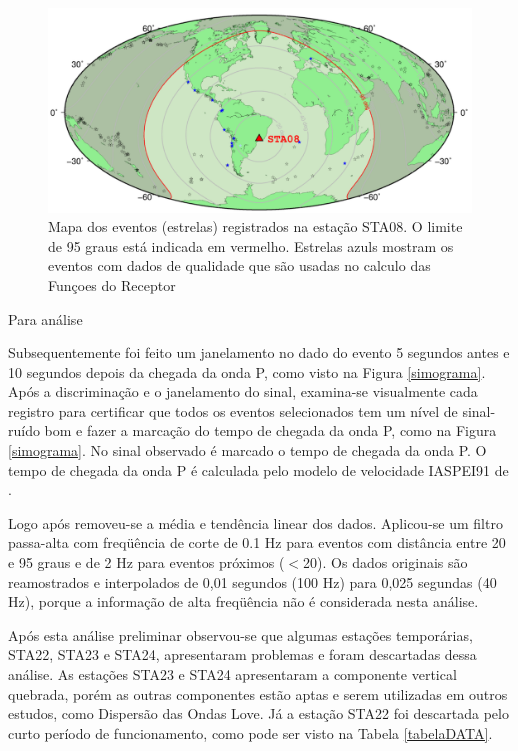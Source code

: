 \begin{figure}[!ht]
\centering
\includegraphics[scale=0.5]{Figs/mapa_de_eventos.png}
\caption[Mapa dos eventos registrados na estação STA08.]{Mapa dos eventos (estrelas) registrados na estação STA08. O limite de 95 graus está indicada em vermelho. Estrelas azuls mostram os eventos com dados de qualidade que são usadas no calculo das Funçoes do Receptor}
\label{mapa_eventos}
\end{figure}

Para análise 

Subsequentemente foi feito um janelamento no dado do evento 5 segundos antes e 10 segundos depois da chegada da onda P, como visto na Figura \ref{simograma}. Após a discriminação e o janelamento do sinal, examina-se visualmente cada registro para certificar que todos os eventos selecionados tem um nível de sinal-ruído bom e fazer a marcação do tempo de chegada da onda P, como na Figura \ref{simograma}. No sinal observado é marcado o tempo de chegada da onda P. O tempo de chegada da onda P é calculada pelo modelo de velocidade IASPEI91 de \cite{kennet_iaspei_1991}.

Logo após removeu-se a média e tendência linear dos dados. Aplicou-se um filtro passa-alta com freqüência de corte de 0.1 Hz para eventos com distância entre 20 e 95 graus e de 2 Hz para eventos próximos ($<$20). Os dados originais são reamostrados e interpolados de 0,01 segundos (100 Hz) para 0,025 segundas (40 Hz), porque a informação de alta freqüência não é considerada nesta análise.

Após esta análise preliminar observou-se que algumas estações temporárias, STA22, STA23 e STA24, apresentaram problemas e foram descartadas dessa análise. As estações STA23 e STA24 apresentaram a componente vertical quebrada, porém as outras componentes estão aptas e serem utilizadas em outros estudos, como Dispersão das Ondas Love. Já a estação STA22 foi descartada pelo curto período de funcionamento, como pode ser visto na Tabela \ref{tabelaDATA}.


